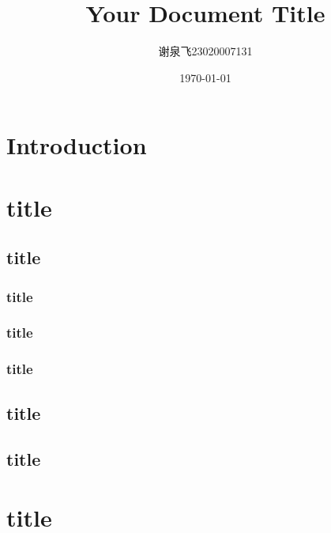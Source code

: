 \documentclass{article}
\begin{document}
	
	\title{Your Document Title}
	\author{谢泉飞23020007131}
	\date{\today} %
	\maketitle
	
	\tableofcontents
	\newpage
	
	
	\section{Introduction}
	\section{title}
		\subsection{title}
			\subsubsection{title}
			
			\subsubsection{title}
			
			\subsubsection{title}
			
			
			
		\subsection{title}
		
		\subsection{title}
		
	\section{title}
	
	
\end{document}
